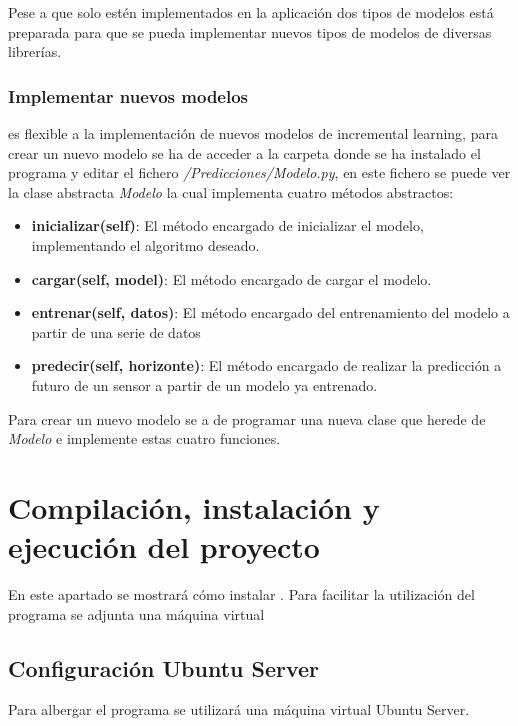Pese a que solo estén implementados en la aplicación dos tipos de modelos está preparada para que se pueda implementar nuevos tipos de modelos de diversas librerías.

\subsubsection{Implementar nuevos modelos}

\nombrePrograma es flexible a la implementación de nuevos modelos de incremental learning, para crear un nuevo modelo se ha de acceder a la carpeta donde se ha instalado el programa y editar el fichero \textit{/Predicciones/Modelo.py}, en este fichero se puede ver la clase abstracta \textit{Modelo} la cual implementa cuatro métodos abstractos:
\begin{itemize}
    \item \textbf{inicializar(self)}: El método encargado de inicializar el modelo, implementando el algoritmo deseado.
    
    \item \textbf{cargar(self, model)}:  El método encargado de cargar el modelo.
    
    \item \textbf{entrenar(self, datos)}: El método encargado del entrenamiento del modelo a partir de una serie de datos
    \item \textbf{predecir(self, horizonte)}: El método encargado de realizar la predicción a futuro de un sensor a partir de un modelo ya entrenado.
\end{itemize}

Para crear un nuevo modelo se a de programar una nueva clase que herede de \textit{Modelo} e implemente estas cuatro funciones.

\section{Compilación, instalación y ejecución del proyecto}

En este apartado se mostrará cómo instalar \nombrePrograma. Para facilitar la utilización del programa se adjunta una máquina virtual 

\subsection{Configuración Ubuntu Server}

Para albergar el programa se utilizará una máquina virtual Ubuntu Server.

